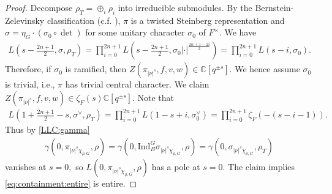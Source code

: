 \documentclass[10pt]{amsart}
\theoremstyle{definition}
\numberwithin{equation}{section}
\numberwithin{equation}{subsection}
\newcommand{\CC}{\mathbb{C}}
\begin{document}
\begin{proof}
Decompose $\rho_T=\oplus_i\rho_i$ into irreducible submodules. By the Bernstein-Zelevinsky classification (c.f. \cite[Theorem 8.4.3]{GH:book}), $\pi$ is a twisted Steinberg representation and $\sigma=\eta_G\cdot (\sigma_0\circ\det)$ for some unitary character $\sigma_0$ of $F^\times$. We have 
\begin{align*}
    L(s-\tfrac{2n+1}{2},\sigma,\rho_T)=\prod_{i=0}^{2n+1} L(s-\tfrac{2n+1}{2}, \sigma_0|\cdot|^{\tfrac{2n+1-2i}{2}})=\prod_{i=0}^{2n+1}L(s-i,\sigma_0).
\end{align*}
Therefore, if $\sigma_0$ is ramified, then $Z(\pi_{|\nu|^s},f,v,w)\in \CC[q^{\pm s}].$ We hence assume $\sigma_0$ is trivial, i.e., $\pi$ has trivial central character. We claim $Z(\pi_{|\nu|^s}, f,v,w)\in \zeta_F(s)\CC[q^{\pm s}].$ Note that
\begin{align*}
     L(1+\tfrac{2n+1}{2}-s,\sigma^\lor,\rho_{T})=\prod_{i=0}^{2n+1} L(1-s+i,\sigma_0^\lor)=\prod_{i=0}^{2n+1}\zeta_F(-(s-i-1)).
\end{align*}
Thus by \eqref{LLC:gamma}
\begin{align*}
    \gamma(0,\pi_{|\nu|^s\chi_{\rho,G}},\rho)=\gamma(0,\mathrm{Ind}_B^G \sigma_{|\nu|^s\chi_{\rho,G}},\rho)=\gamma(0, \sigma_{|\nu|^s\chi_{\rho,G}},\rho_T)
\end{align*}
vanishes at $s=0,$ so $L(0,\pi_{|\nu|^s\chi_{\rho,G}},\rho)$ has a pole at $s=0$. The claim implies \eqref{eq:containment:entire} is entire.


\end{proof}
\end{document}
